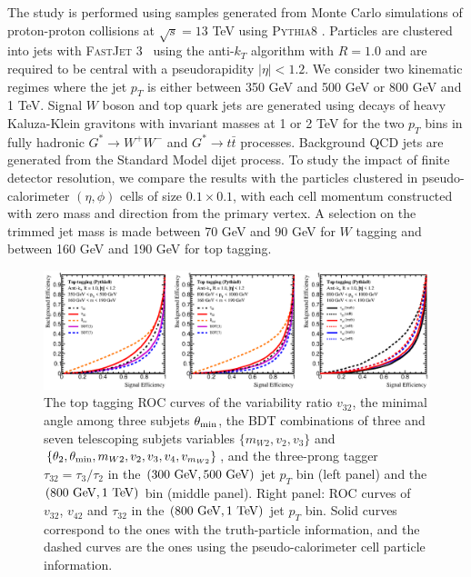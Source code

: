 \documentclass[aps,prl,floatfix,preprintnumbers,twocolumn,groupedaddress,nofootinbib]{revtex4-1}
\begin{document}
The study is performed using samples generated from Monte Carlo simulations of proton-proton collisions at $\sqrt{s}=13$ TeV using \textsc{Pythia8} \cite{Sjostrand:2007gs}. Particles are clustered into jets with \textsc{FastJet} 3~\cite{Cacciari:2011ma} using the anti-$k_T$ algorithm \cite{Cacciari:2008gp} with $R=1.0$ and are required to be central with a pseudorapidity $|\eta|<1.2$. We consider two kinematic regimes where the jet $p_T$ is either between 350 GeV and 500 GeV or 800 GeV and 1 TeV. Signal $W$ boson and top quark jets are generated using decays of heavy Kaluza-Klein gravitons with invariant masses at 1 or 2 TeV for the two $p_T$ bins in fully hadronic $G^*\rightarrow W^+W^-$ and $G^*\rightarrow t\bar t$ processes. Background QCD jets are generated from the Standard Model dijet process. To study the impact of finite detector resolution, we compare the results with the particles clustered in pseudo-calorimeter $(\eta,\phi)$ cells of size $0.1\times 0.1$, with each cell momentum constructed with zero mass and direction from the primary vertex. A selection on the trimmed jet mass is made between 70 GeV and 90 GeV for $W$ tagging and between 160 GeV and 190 GeV for top tagging.

\begin{figure}
    \includegraphics[width=2\columnwidth]{plots/Top_ROCs_2.eps}
    \caption{The top tagging ROC curves of the variability ratio $v_{32}$, the minimal angle among three subjets $\theta_{\rm min}$, the BDT combinations of three and seven telescoping subjets variables $\{m_{W2},v_2,v_3\}$ and $\{\theta_2,\theta_{\rm min},m_{W2},v_2,v_3,v_4,v_{m_{W2}}\}$, and the three-prong tagger $\tau_{32}=\tau_{3}/\tau_{2}$ in the $(300~{\rm GeV}, 500~{\rm GeV})$ jet $p_T$ bin (left panel) and the $(800~{\rm GeV}, 1~{\rm TeV})$ bin (middle panel). Right panel: ROC curves of $v_{32}$, $v_{42}$ and $\tau_{32}$ in the $(800~{\rm GeV}, 1~{\rm TeV})$ jet $p_T$ bin. Solid curves correspond to the ones with the truth-particle information, and the dashed curves are the ones using the pseudo-calorimeter cell particle information.}
\label{ROC_top}
\end{figure}
\end{document}
